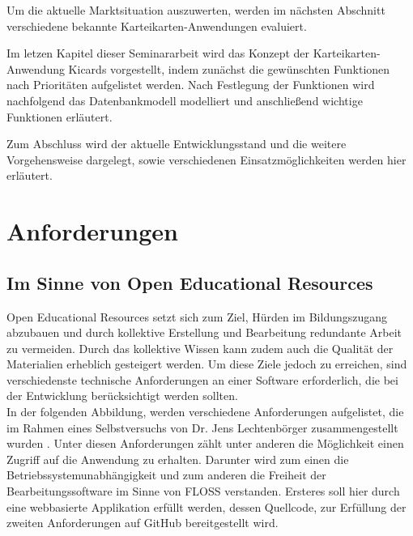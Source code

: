 Um die aktuelle Marktsituation auszuwerten, werden im nächsten Abschnitt verschiedene bekannte Karteikarten-Anwendungen evaluiert. 

Im letzen Kapitel dieser Seminararbeit wird das Konzept der Karteikarten-Anwendung Kicards vorgestellt, indem zunächst die gewünschten Funktionen nach Prioritäten aufgelistet werden. Nach Festlegung der Funktionen wird nachfolgend das Datenbankmodell modelliert und anschließend wichtige Funktionen erläutert. 

Zum Abschluss wird der aktuelle Entwicklungsstand und die weitere Vorgehensweise dargelegt, sowie verschiedenen Einsatzmöglichkeiten werden hier erläutert.


\section{Anforderungen}


\subsection{Im Sinne von Open Educational Resources}
Open Educational Resources setzt sich zum Ziel, Hürden im Bildungszugang abzubauen und durch kollektive Erstellung und Bearbeitung redundante Arbeit zu vermeiden. Durch das kollektive Wissen kann zudem auch die Qualität der Materialien erheblich gesteigert werden. Um diese Ziele jedoch zu erreichen, sind verschiedenste technische Anforderungen an einer Software erforderlich, die bei der Entwicklung berücksichtigt werden sollten. \\

In der folgenden Abbildung, werden verschiedene Anforderungen aufgelistet, die im Rahmen eines Selbstversuchs von Dr. Jens Lechtenbörger zusammengestellt wurden \cite{Lechtenborger.2019}. Unter diesen Anforderungen zählt unter anderen die Möglichkeit einen Zugriff auf die Anwendung zu erhalten. Darunter wird zum einen die Betriebssystemunabhängigkeit und zum anderen die Freiheit der Bearbeitungssoftware im Sinne von FLOSS verstanden. Ersteres soll hier durch eine webbasierte Applikation erfüllt werden, dessen Quellcode, zur Erfüllung der zweiten Anforderungen auf GitHub bereitgestellt wird. 

